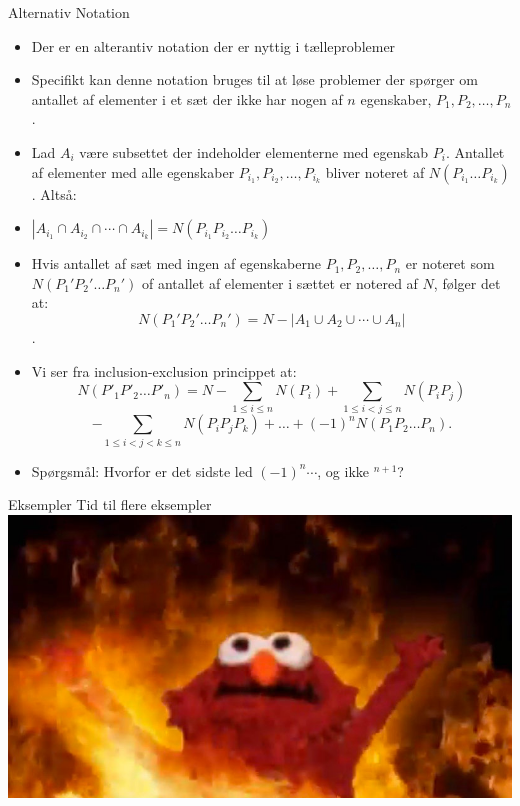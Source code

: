 \documentclass{beamer}
\begin{document}
\begin{frame}[allowframebreaks]{Alternativ Notation}
\begin{itemize}
    \item Der er en alterantiv notation der er nyttig i tælleproblemer
    \item Specifikt kan denne notation bruges til at løse problemer der spørger om antallet af elementer i et sæt der ikke har nogen af $n$ egenskaber, $P_1, P_2, \ldots, P_n$.
    \item Lad $A_i$ være subsettet der indeholder elementerne med egenskab $P_i$. Antallet af elementer med alle egenskaber $P_{i_1}, P_{i_2}, \ldots, P_{i_k}$ bliver noteret af $N(P_{i_1} \ldots P_{i_k})$. Altså:
    \item $|A_{i_1} \cap A_{i_2} \cap \cdots \cap A_{i_k}| = N(P_{i_1}P_{i_2} \ldots P_{i_k})$
   \item Hvis antallet af sæt med ingen af egenskaberne $P_1, P_2, \ldots, P_n$  er noteret som $N(P_1' P_2' \ldots P_n')$ of antallet af elementer i sættet er notered af $N$, følger det at: $$N(P_1'P_2' \ldots P_n') = N - |A_1 \cup A_2 \cup \cdots \cup A_n|$$.
   \item Vi ser fra inclusion-exclusion princippet at: $$N(P'_1 P'_2 \dots P'_n) = N - \sum_{1 \leq i \leq n} N(P_i) + \sum_{1 \leq i < j \leq n} N(P_i P_j)$$
   $$ - \sum_{1 \leq i < j < k \leq n} N(P_i P_j P_k) + \dots + (-1)^n N(P_1 P_2 \dots P_n). $$
   \item Spørgsmål: Hvorfor er det sidste led $(-1)^n \cdots$, og ikke $^{n+1}$?
\end{itemize}
\end{frame}

\begin{frame}{Eksempler}
   Tid til flere eksempler
   \includegraphics[scale=0.4]{elmo.jpg}
\end{frame}
\end{document}
